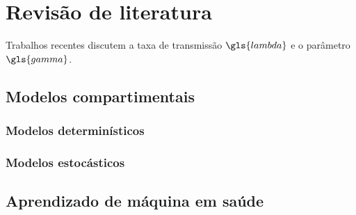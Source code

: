\chapter{Revisão de literatura}
\label{cap:revisao}

\lipsum[1]

Trabalhos recentes \cite{Almeida2019,Nassif2022,Rieder2020} discutem a taxa de transmissão $\gls{lambda}$ e o parâmetro $\gls{gamma}$. \lipsum[3][1-3]

\section{Modelos compartimentais}
\lipsum[2-3]

\subsection{Modelos determinísticos}
\lipsum[5]

\subsection{Modelos estocásticos}
\lipsum[6]

\section{Aprendizado de máquina em saúde}
\lipsum[3-4]

